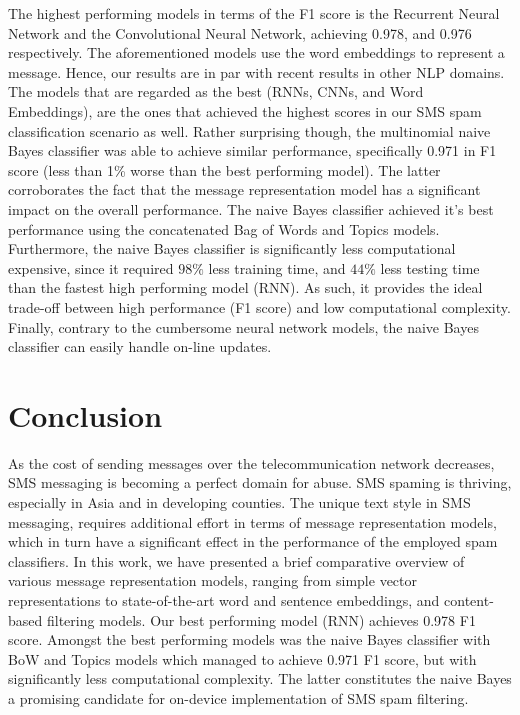\documentclass[letterpaper]{article}
\begin{document}
The highest performing models in terms of the F1 score is the Recurrent Neural Network and the Convolutional Neural Network, achieving 0.978, and 0.976 respectively. The aforementioned models use the word embeddings to represent a message. Hence, our results are in par with recent results in other NLP domains. The models that are regarded as the best (RNNs, CNNs, and Word Embeddings), are the ones that achieved the highest scores in our SMS spam classification scenario as well. Rather surprising though, the multinomial naive Bayes classifier was able to achieve similar performance, specifically 0.971 in F1 score (less than 1\% worse than the best performing model). The latter corroborates the fact that the message representation model has a significant impact on the overall performance. The naive Bayes classifier achieved it's best performance using the concatenated Bag of Words and Topics models. Furthermore, the naive Bayes classifier is significantly less computational expensive, since it required $98\%$ less training time, and $44\%$ less testing time than the fastest high performing model (RNN). As such, it provides the ideal trade-off between high performance (F1 score) and low computational complexity. Finally, contrary to the cumbersome neural network models, the naive Bayes classifier can easily handle on-line updates.

\section{Conclusion} \label{Conclusion}

As the cost of sending messages over the telecommunication network decreases, SMS messaging is becoming a perfect domain for abuse. SMS spaming is thriving, especially in Asia and in developing counties. The unique text style in SMS messaging, requires additional effort in terms of message representation models, which in turn have a significant effect in the performance of the employed spam classifiers. In this work, we have presented a brief comparative overview of various message representation models, ranging from simple vector representations to state-of-the-art word and sentence embeddings, and content-based filtering models. Our best performing model (RNN) achieves 0.978 F1 score. Amongst the best performing models was the naive Bayes classifier with BoW and Topics models which managed to achieve 0.971 F1 score, but with significantly less computational complexity. The latter constitutes the naive Bayes a promising candidate for on-device implementation of SMS spam filtering.
\end{document}
